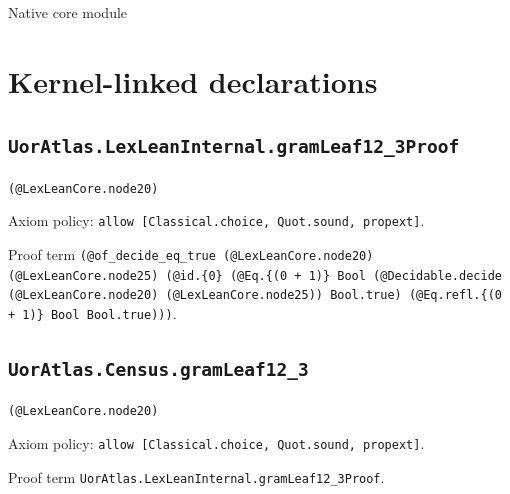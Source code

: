 \documentclass[11pt]{article}
\begin{document}
\begin{center}{\LARGE Native core module}\end{center}
\section*{Kernel-linked declarations}
\subsection*{\texttt{UorAtlas.LexLeanInternal.gramLeaf12\_3Proof}}
\noindent\texttt{(@LexLeanCore.node20)}\par
\noindent Axiom policy: \texttt{allow [Classical.choice, Quot.sound, propext]}.\par
\noindent Proof term \texttt{(@of\_decide\_eq\_true (@LexLeanCore.node20) (@LexLeanCore.node25) (@id.\{0\} (@Eq.\{(0 + 1)\} Bool (@Decidable.decide (@LexLeanCore.node20) (@LexLeanCore.node25)) Bool.true) (@Eq.refl.\{(0 + 1)\} Bool Bool.true)))}.\par
\subsection*{\texttt{UorAtlas.Census.gramLeaf12\_3}}
\noindent\texttt{(@LexLeanCore.node20)}\par
\noindent Axiom policy: \texttt{allow [Classical.choice, Quot.sound, propext]}.\par
\noindent Proof term \texttt{UorAtlas.LexLeanInternal.gramLeaf12\_3Proof}.\par
\end{document}
